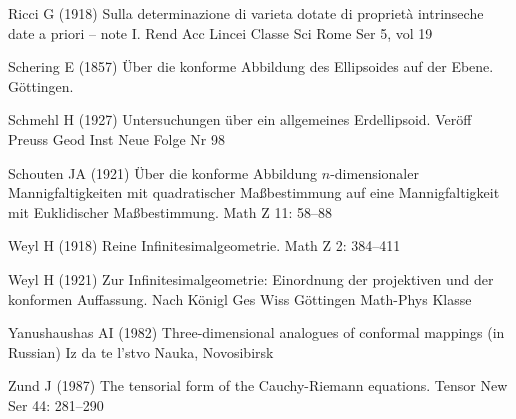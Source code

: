 \documentclass[jog]{svjour}
\begin{document}
\begin{thebibliography}{}
 Ricci G (1918) Sulla determinazione di
varieta dotate di propriet\`{a} intrinseche date a priori -- note I. Rend
Acc Lincei Classe Sci Rome Ser 5, vol 19

 Schering E (1857) \"{U}ber die konforme
Abbildung des Ellipsoides auf der Ebene. G\"{o}ttingen.

\pagebreak

 Schmehl H (1927) Untersuchungen \"{u}ber
ein allgemeines Erdellipsoid. Ver\"{o}ff Preuss Geod Inst Neue Folge Nr
98

 Schouten JA (1921) \"{U}ber die
konforme Abbildung $n$-dimensionaler Mannigfaltigkeiten mit
quadratischer Ma{\ss}bestimmung auf eine Mannigfaltigkeit mit
Euklidischer Ma{\ss}bestimmung. Math Z 11: 58--88

 Weyl H (1918) Reine Infinitesimalgeometrie.
Math Z 2: 384--411

\pagebreak

 Weyl H (1921) Zur Infinitesimalgeometrie:
Einordnung der projektiven und der konformen Auffassung. Nach K\"{o}nigl
Ges Wiss G\"{o}ttingen Math-Phys Klasse

 Yanushaushas AI (1982)
Three-dimensional analogues of conformal mappings (in Russian) Iz da te
l'stvo Nauka, Novosibirsk

 Zund J (1987) The tensorial form of the
Cauchy-Riemann equations. Tensor New Ser 44: 281--290

\end{thebibliography}
\end{document}
